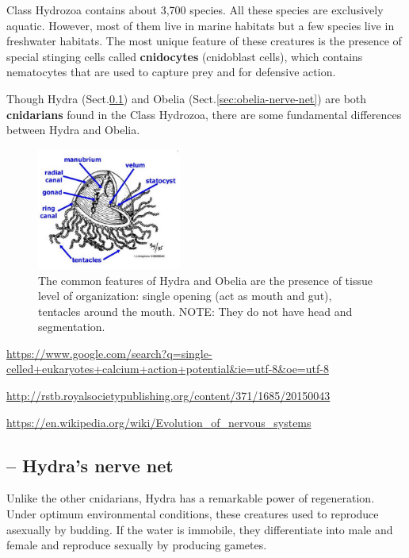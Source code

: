 Class Hydrozoa contains about 3,700 species. All these species are exclusively
aquatic. However, most of them live in marine habitats but a few species live in
freshwater habitats.  The most unique feature of these creatures is the presence
of special stinging cells called {\bf cnidocytes} (cnidoblast cells), which
contains nematocytes that are used to capture prey and for defensive action.

Though Hydra (Sect.\ref{sec:hydra}) and Obelia (Sect.\ref{sec:obelia-nerve-net})
are both {\bf cnidarians} found in the Class Hydrozoa, there are some
fundamental differences between Hydra and Obelia.

\begin{figure}[hbt]
  \centerline{\includegraphics[height=4cm,
    angle=0]{./images/hydrozoa.eps}}
\caption{The common features of Hydra and Obelia are the presence of tissue
level of organization: single opening (act as mouth and gut), tentacles around
the mouth. NOTE: They do not have head and segmentation. }
\label{fig:hydrozoa}
\end{figure}



\url{https://www.google.com/search?q=single-celled+eukaryotes+calcium+action+potential&ie=utf-8&oe=utf-8}

\url{http://rstb.royalsocietypublishing.org/content/371/1685/20150043}

\url{https://en.wikipedia.org/wiki/Evolution_of_nervous_systems}



\subsection{-- Hydra's nerve net}
\label{sec:hydra}

Unlike the other cnidarians, Hydra has a remarkable power of regeneration. Under
optimum environmental conditions, these creatures used to reproduce asexually by
budding. If the water is immobile, they differentiate into male and female and
reproduce sexually by producing gametes.   

